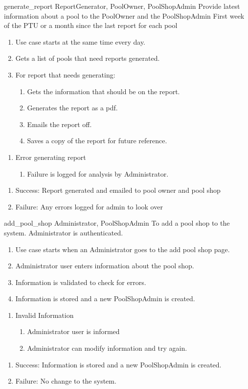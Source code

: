 \usecase
{generate\_report}
{ReportGenerator, PoolOwner, PoolShopAdmin}
{Provide latest information about a pool to the PoolOwner and the PoolShopAdmin}
{First week of the PTU or a month since the last report for each pool}
{
\begin{enumerate}
\item Use case starts at the same time every day.
\item Gets a list of pools that need reports generated.
\item For report that needs generating:
\begin{enumerate}
\item Gets the information that should be on the report.
\item Generates the report as a pdf.
\item Emails the report off.
\item Saves a copy of the report for future reference.
\end{enumerate}
\end{enumerate}
}
{
\begin{enumerate}
\item Error generating report
\begin{enumerate}
\item Failure is logged for analysis by Administrator.
\end{enumerate}
\end{enumerate}
}
{
\begin{enumerate}
\item Success: Report generated and emailed to pool owner and pool shop
\item Failure: Any errors logged for admin to look over
\end{enumerate}
}

\usecase
{add\_pool\_shop}
{Administrator, PoolShopAdmin}
{To add a pool shop to the system.}
{Administrator is authenticated.}
{
\begin{enumerate}
\item Use case starts when an Administrator goes to the add pool shop page.
\item Administrator user enters information about the pool shop.
\item Information is validated to check for errors.
\item Information is stored and a new PoolShopAdmin is created.
\end{enumerate}
}
{
\begin{enumerate}
\item Invalid Information
\begin{enumerate}
\item Administrator user is informed
\item Administrator can modify information and try again.
\end{enumerate}
\end{enumerate}
}
{
\begin{enumerate}
\item Success: Information is stored and a new PoolShopAdmin is created.
\item Failure: No change to the system.
\end{enumerate}
}

